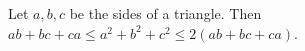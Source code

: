 Let $a, b, c$ be the sides of a triangle. Then $ab + bc + ca \leq a^2 + b^2 + c^2 \leq 2(ab + bc + ca)$.
